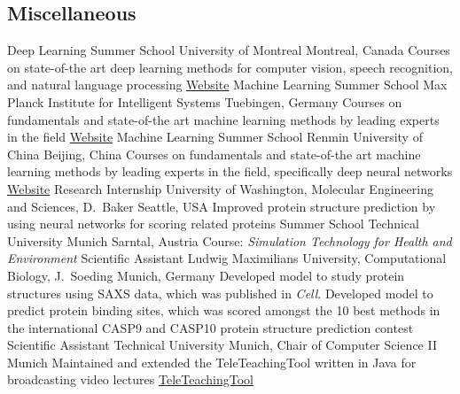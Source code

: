 \documentclass[11pt,a4paper]{moderncv}
\newcommand\chref[3][magenta]{\href{#2}{\small\color{#1}#3}}
\begin{document}
\subsection{Miscellaneous}
         {Deep Learning Summer School}
         {\hfill\break University of Montreal}
         {Montreal, Canada}
         {\hfill\break Courses on state-of-the art deep learning methods for computer vision, speech recognition, and natural language processing}
         {\chref{https://sites.google.com/site/deeplearningsummerschool/home}{Website}}
         {Machine Learning Summer School}
         {\hfill\break Max Planck Institute for Intelligent Systems}
         {Tuebingen, Germany}
         {\hfill\break Courses on fundamentals and state-of-the art machine learning methods by leading experts in the field}
         {\chref{http://mlss.tuebingen.mpg.de/2015/}{Website}}
         {Machine Learning Summer School}
         {\hfill\break Renmin University of China}
         {Beijing, China}
         {\hfill\break Courses on fundamentals and state-of-the art machine learning methods by leading experts in the field, specifically deep neural networks}
         {\chref{http://lamda.nju.edu.cn/conf/mlss2014/}{Website}}
         {Research Internship}
         {\hfill\break University of Washington, Molecular Engineering and Sciences, D.~Baker}
         {Seattle, USA}
         {\hfill\break Improved protein structure prediction by using neural networks for scoring related proteins}
         {}
         {Summer School}
         {\hfill\break Technical University Munich}
         {Sarntal, Austria}
         {\hfill\break Course: \textit{Simulation Technology for Health and Environment}}
         {}
         {Scientific Assistant}
         {\hfill\break Ludwig Maximilians University, Computational Biology, J.~Soeding}
         {Munich, Germany}
         {\hfill\break Developed model to study protein structures using SAXS data, which was published in \textit{Cell}. Developed model to predict protein binding sites, which was scored amongst the 10 best methods in the international CASP9 and CASP10 protein structure prediction contest}
         {}
         {Scientific Assistant}
         {Technical University Munich, Chair of Computer Science II}
         {Munich}
         {\hfill\break Maintained and extended the TeleTeachingTool written in Java for broadcasting video lectures}
         {\chref{http://ttt.in.tum.de/}{TeleTeachingTool}}
\end{document}
